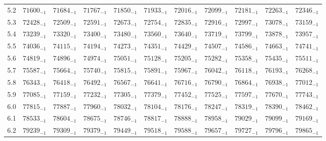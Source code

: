 \documentclass[10pt, a4paper]{article}
\begin{document}
\begin{center}
\begin{longtable}{c || c c c c c | c c c c c}
        5.2 & \({71600}_{-1}\) & \({71684}_{-1}\) & \({71767}_{-1}\) & \({71850}_{-1}\) & \({71933}_{-1}\) & \({72016}_{-1}\) & \({72099}_{-1}\) & \({72181}_{-1}\) & \({72263}_{-1}\) & \({72346}_{-1}\)\\
        5.3 & \({72428}_{-1}\) & \({72509}_{-1}\) & \({72591}_{-1}\) & \({72673}_{-1}\) & \({72754}_{-1}\) & \({72835}_{-1}\) & \({72916}_{-1}\) & \({72997}_{-1}\) & \({73078}_{-1}\) & \({73159}_{-1}\)\\
        5.4 & \({73239}_{-1}\) & \({73320}_{-1}\) & \({73400}_{-1}\) & \({73480}_{-1}\) & \({73560}_{-1}\) & \({73640}_{-1}\) & \({73719}_{-1}\) & \({73799}_{-1}\) & \({73878}_{-1}\) & \({73957}_{-1}\)\\
        5.5 & \({74036}_{-1}\) & \({74115}_{-1}\) & \({74194}_{-1}\) & \({74273}_{-1}\) & \({74351}_{-1}\) & \({74429}_{-1}\) & \({74507}_{-1}\) & \({74586}_{-1}\) & \({74663}_{-1}\) & \({74741}_{-1}\)\\
        5.6 & \({74819}_{-1}\) & \({74896}_{-1}\) & \({74974}_{-1}\) & \({75051}_{-1}\) & \({75128}_{-1}\) & \({75205}_{-1}\) & \({75282}_{-1}\) & \({75358}_{-1}\) & \({75435}_{-1}\) & \({75511}_{-1}\)\\
        5.7 & \({75587}_{-1}\) & \({75664}_{-1}\) & \({75740}_{-1}\) & \({75815}_{-1}\) & \({75891}_{-1}\) & \({75967}_{-1}\) & \({76042}_{-1}\) & \({76118}_{-1}\) & \({76193}_{-1}\) & \({76268}_{-1}\)\\
        5.8 & \({76343}_{-1}\) & \({76418}_{-1}\) & \({76492}_{-1}\) & \({76567}_{-1}\) & \({76641}_{-1}\) & \({76716}_{-1}\) & \({76790}_{-1}\) & \({76864}_{-1}\) & \({76938}_{-1}\) & \({77012}_{-1}\)\\
        5.9 & \({77085}_{-1}\) & \({77159}_{-1}\) & \({77232}_{-1}\) & \({77305}_{-1}\) & \({77379}_{-1}\) & \({77452}_{-1}\) & \({77525}_{-1}\) & \({77597}_{-1}\) & \({77670}_{-1}\) & \({77743}_{-1}\)\\
        6.0 & \({77815}_{-1}\) & \({77887}_{-1}\) & \({77960}_{-1}\) & \({78032}_{-1}\) & \({78104}_{-1}\) & \({78176}_{-1}\) & \({78247}_{-1}\) & \({78319}_{-1}\) & \({78390}_{-1}\) & \({78462}_{-1}\)\\
        6.1 & \({78533}_{-1}\) & \({78604}_{-1}\) & \({78675}_{-1}\) & \({78746}_{-1}\) & \({78817}_{-1}\) & \({78888}_{-1}\) & \({78958}_{-1}\) & \({79029}_{-1}\) & \({79099}_{-1}\) & \({79169}_{-1}\)\\
        6.2 & \({79239}_{-1}\) & \({79309}_{-1}\) & \({79379}_{-1}\) & \({79449}_{-1}\) & \({79518}_{-1}\) & \({79588}_{-1}\) & \({79657}_{-1}\) & \({79727}_{-1}\) & \({79796}_{-1}\) & \({79865}_{-1}\)\\

\end{longtable}
\end{center}
\end{document}
